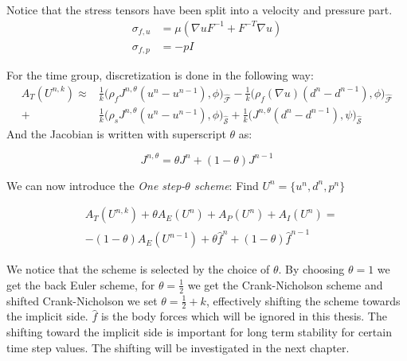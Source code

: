 Notice that the stress tensors have been split into a velocity and pressure part. 
\begin{align}
\sigma_{f,u} &= \mu ( \nabla u F^{-1} + F^{-T} \nabla u) \\
\sigma_{f,p} &= -p I
\end{align}

For the time group, discretization is done in the following way:
\begin{align}
A_T(U^{n,k}) \approx & \frac{1}{k} \big( \rho_f J^{n,\theta} (u^n - u^{n-1}) , \phi  \big)_{\mathcal{\hat{F}}} - \frac{1}{k} \big( \rho_f (\nabla u ) (d^n - d^{n-1}) , \phi \big)_{\mathcal{\hat{F}}} \\
+ & \frac{1}{k} \big( \rho_s J^{n,\theta} (u^n - u^{n-1}) , \phi  \big)_{\mathcal{\hat{S}}} +  \frac{1}{k} \big(  J^{n,\theta} (d^n - d^{n-1}) , \psi  \big)_{\mathcal{\hat{S}}}
\end{align}
And the Jacobian is written with superscript $\theta$ as:

\begin{equation}
J^{n, \theta} = \theta J^n + (1-\theta)J^{n-1}
\end{equation}

We can now introduce the \textit{One step-$\theta$ scheme}: 
Find $U^n = \{u^n , d^n, p^n \}$

\begin{align}
& A_T(U^{n,k}) + \theta A_E(U^{n}) + A_P(U^{n}) + A_I(U^{n}) = \\
& - (1-\theta) A_E(U^{n-1}) + \theta \hat{f}^n + (1-\theta) \hat{f}^{n-1}  
\end{align}

We notice that the scheme is selected by the choice of $\theta $. By choosing $ \theta = 1$ we get the back Euler scheme, for $ \theta = \frac{1}{2}$ we get the Crank-Nicholson scheme and shifted Crank-Nicholson we set $ \theta = \frac{1}{2} + k$, effectively shifting the scheme towards the implicit side. $\hat{f}$ is the body forces which will be ignored in this thesis. The shifting toward the implicit side is important for long term stability for certain time step values. The shifting will be investigated in the next chapter.






